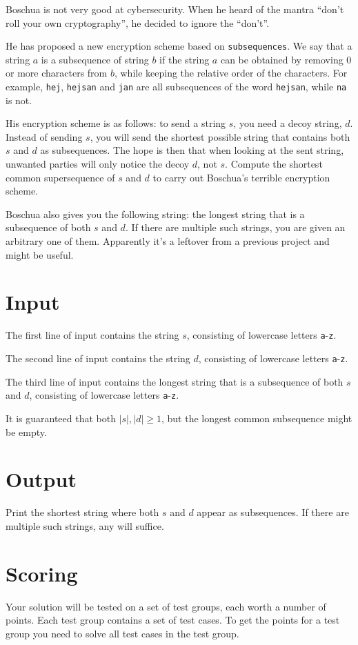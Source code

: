 \noindent
Boschua is not very good at cybersecurity. When he heard of the mantra ``don't roll your own cryptography'', he
decided to ignore the ``don't''.

He has proposed a new encryption scheme based on \texttt{subsequences}. We say that a string $a$ is a subsequence
of string $b$ if the string $a$ can be obtained by removing $0$ or more characters from $b$, while keeping the
relative order of the characters. For example, \texttt{hej}, \texttt{hejsan} and \texttt{jan} are all subsequences of the word
\texttt{hejsan}, while \texttt{na} is not. 

His encryption scheme is as follows: to send a string $s$, you need a decoy string, $d$. Instead of sending $s$,
you will send the shortest possible string that contains both $s$ and $d$ as subsequences. The hope is then that when
looking at the sent string, unwanted parties will only notice the decoy $d$, not $s$. 
Compute the shortest common supersequence of $s$ and $d$ to carry out Boschua's terrible encryption scheme.

Boschua also gives you the following string: the longest string that is a subsequence of both $s$ and $d$.
If there are multiple such strings, you are given an arbitrary one of them.
Apparently it's a leftover from a previous project and might be useful.

\section*{Input}
The first line of input contains the string $s$, consisting of lowercase letters \texttt{a}-\texttt{z}.

The second line of input contains the string $d$, consisting of lowercase letters \texttt{a}-\texttt{z}.

The third line of input contains the longest string that is a subsequence of both $s$ and $d$,
consisting of lowercase letters \texttt{a}-\texttt{z}.

It is guaranteed that both $|s|, |d| \geq 1$, but the longest common subsequence might be empty.

\section*{Output}
Print the shortest string where both $s$ and $d$ appear as subsequences. If there are multiple such strings, any will suffice.

\section*{Scoring}
Your solution will be tested on a set of test groups, each worth a number of points. Each test group contains
a set of test cases. To get the points for a test group you need to solve all test cases in the test group.

